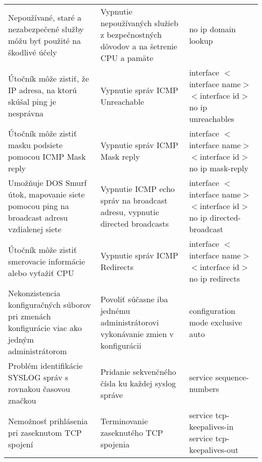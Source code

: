 \begin{longtable}[!htbp]{|L{10em}L{10em}L{34em}|}
	
	
	Nepoužívané, staré a nezabezpečené služby môžu byť použité na škodlivé účely	&Vypnutie nepoužívaných služieb z bezpečnostných dôvodov a na šetrenie CPU a pamäte 	&no ip domain lookup\\
	
	
	
	 Útočník môže zistiť, že IP adresa, na ktorú skúšal ping je nesprávna	&Vypnutie správ ICMP Unreachable	&interface $<$interface name$>$ $<$interface id$>$
	no ip unreachables\\
	
	
	
	
	Útočník môže zistiť masku podsiete pomocou ICMP Mask reply	&Vypnutie správ ICMP Mask reply	&interface $<$interface name$>$ $<$interface id$>$
	no ip mask-reply\\
	
	
	
	
	 Umožňuje DOS Smurf útok, mapovanie siete pomocou ping na broadcast adresu vzdialenej siete	&Vypnutie ICMP echo správ na broadcast adresu, vypnutie directed broadcasts	&interface $<$interface name$>$ $<$interface id$>$
	no ip directed-broadcast\\
	
	
	
	
	Útočník môže zistiť smerovacie informácie alebo vyťažiť CPU	&Vypnutie správ ICMP Redirects	&interface $<$interface name$>$ $<$interface id$>$
	no ip redirects\\
	
	
	
	 Nekonzistencia konfiguračných súborov pri zmenách konfigurácie viac ako jedným administrátorom	&Povoliť súčasne iba jednému administrátorovi vykonávanie zmien v konfigurácii	&configuration mode exclusive auto\\
	
	
	
	
	Problém identifikácie SYSLOG správ s rovnakou časovou značkou	&Pridanie sekvenčného čísla ku každej syslog správe	&service sequence-numbers\\
	
	
	
	
	 Nemožnosť prihlásenia pri zaseknutom TCP spojení	&Terminovanie zaseknutého TCP spojenia	&service tcp-keepalives-in
	service tcp-keepalives-out\\
	
	
	

\end{longtable}
